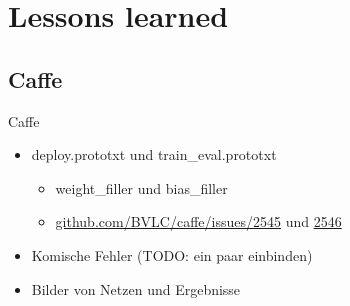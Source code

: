\section{Lessons learned}

\subsection{Caffe}

\begin{frame}{Caffe}
    \begin{itemize}
        \item deploy.prototxt und train\_eval.prototxt
        \begin{itemize}
            \item weight\_filler und bias\_filler
            \item \href{https://github.com/BVLC/caffe/issues/2545}{github.com/BVLC/caffe/issues/2545}
                  und \href{https://github.com/BVLC/caffe/issues/2546}{2546}
        \end{itemize}
        \item Komische Fehler (TODO: ein paar einbinden)
        \item Bilder von Netzen und Ergebnisse
    \end{itemize}
\end{frame}
